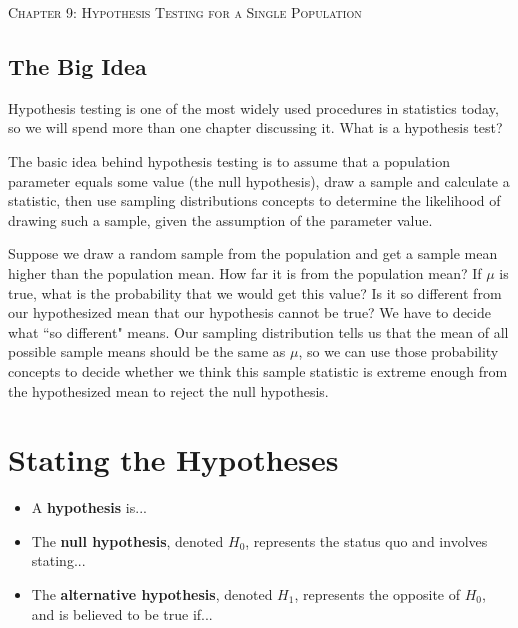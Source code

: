 \documentclass[12pt, letterpaper]{article}
\theoremstyle{definition}
\begin{document}


\begin{center}

{\LARGE \textsc{Chapter 9:  Hypothesis Testing for a Single Population}}
\end{center}

\begin{statement}
\section*{The Big Idea}

Hypothesis testing is one of the most widely used procedures in statistics today, so we will spend more than one chapter discussing it.  What is a hypothesis test?

\vspace*{.1in}

The basic idea behind hypothesis testing is to assume that a population parameter equals some value (the null hypothesis), draw a sample and calculate a statistic, then use sampling distributions concepts to determine the likelihood of drawing such a sample, given the assumption of the parameter value.

\vspace*{.1in}

Suppose we draw a random sample from the population and get a sample mean higher than the population mean.  How far it is from the population mean?  If $\mu$ is true, what is the probability that we would get this value?  Is it so different from our hypothesized mean that our hypothesis cannot be true?  We have to decide what ``so different" means.  Our sampling distribution tells us that the mean of all possible sample means should be the same as $\mu$, so we can use those probability concepts to decide whether we think this sample statistic is extreme enough from the hypothesized mean to reject the null hypothesis.

\end{statement}


\section*{Stating the Hypotheses}


\begin{defn}
\begin{itemize}

\item A \textbf{hypothesis} is...
\vspace*{.5in}

\item The \textbf{null hypothesis}, denoted $H_0$, represents the status quo and involves stating...
\vspace*{.5in}

\item The \textbf{alternative hypothesis}, denoted $H_1$, represents the opposite of $H_0$, and is believed to be true if...
\vspace*{.5in}

\end{itemize}

\end{defn}
\end{document}
